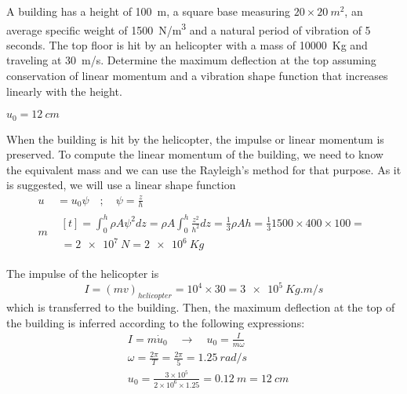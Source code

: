 
\begin{Exercise}[label={helicopter_impulse}]
A building has a height of \qty{100}{m}, a square base measuring $20\times\SI{20}{m^2}$, an average specific weight of \qty{1500}{N/m^3} and a natural period of vibration of 5 seconds. The top floor is hit by an helicopter with a mass of \qty{10000}{Kg} and traveling at \qty{30}{m/s}. Determine the maximum deflection at the top assuming conservation of linear momentum and a vibration shape function that increases linearly with the height.

\begin{center}
\end{center}

\shortAnswer $u_0 = \SI{12}{cm}$
\end{Exercise}



\begin{Answer}[ref={helicopter_impulse}]
When the building is hit by the helicopter, the impulse or linear momentum is preserved. To compute the linear momentum of the building, we need to know the equivalent mass and we can use the Rayleigh's method for that purpose. As it is suggested, we will use a linear shape function
\begin{align*}
u& = u_0\psi \quad ; \quad \psi = \frac{z}{h} \\
m& \begin{multlined}[t]= \int_0^h \rho A\psi^2dz = \rho A\int_0^h\frac{z^2}{h^2}dz = \frac{1}{3}\rho Ah = \frac{1}{3} 1500 \times 400 \times 100 = \\
    = \SI{2e7}{N} = \SI{2e6}{Kg} \end{multlined}
\end{align*}

The impulse of the helicopter is
$$
I = (mv)_{helicopter} = 10^4 \times 30 = \SI{3e5}{Kg.m/s}
$$
which is transferred to the building. Then, the maximum deflection at the top of the building is inferred according to the following expressions:
\begin{align*}
&I = m\dot{u}_0 \quad \rightarrow \quad u_0 = \frac{I}{m\omega} \\
&\omega = \frac{2\pi}{T} = \frac{2\pi}{5} = \SI{1.25}{rad/s} \\
&u_0 = \frac{3\times 10^5}{2\times 10^6\times 1.25} = \SI{0.12}{m} = \SI{12}{cm}
\end{align*}
\end{Answer}
